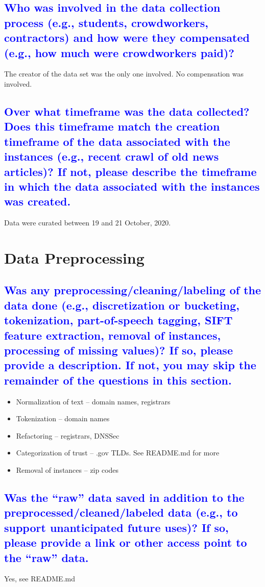 \documentclass[letterpaper, 10 pt, conference]{ieeeconf}  %
\begin{document}
{{\textcolor{blue}{\subsection{Who was involved in the data collection process (e.g., students,
crowdworkers, contractors) and how were they compensated (e.g.,
how much were crowdworkers paid)?}}
The creator of the data set was the only one involved. No compensation was involved.

\textcolor{blue}{\subsection{Over what timeframe was the data collected? Does this timeframe
match the creation timeframe of the data associated with the instances
(e.g., recent crawl of old news articles)? If not, please describe the timeframe in which the data associated with the instances was created.}}
Data were curated between 19 and 21 October, 2020.

\section{Data Preprocessing}

\textcolor{blue}{\subsection{Was any preprocessing/cleaning/labeling of the data done (e.g., discretization or bucketing, tokenization, part-of-speech tagging, SIFT
feature extraction, removal of instances, processing of missing values)? If so, please provide a description. If not, you may skip the remainder of the questions in this section.}}
\begin{itemize}
\item Normalization of text -- domain names, registrars
\item Tokenization -- domain names
\item Refactoring -- registrars, DNSSec
\item Categorization of trust -- .gov TLDs. See README.md for more
\item Removal of instances -- zip codes
\end{itemize}



\textcolor{blue}{\subsection{Was the “raw” data saved in addition to the preprocessed/cleaned/labeled data (e.g., to support unanticipated
future uses)? If so, please provide a link or other access point to the
“raw” data.}}
Yes, see README.md

}}
\end{document}
